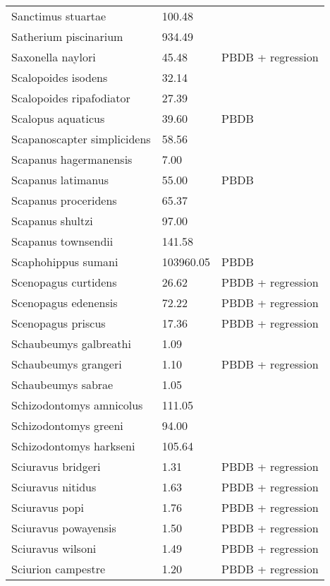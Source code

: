 \documentclass{article}
\begin{document}
\begin{center}
\begin{longtable}{p{} p{} p{}}
    Sanctimus stuartae & 100.48 & \cite{Tomiya2013} \\ 
    Satherium piscinarium & 934.49 & \cite{Tomiya2013} \\ 
    Saxonella naylori & 45.48 & PBDB + regression \\ 
    Scalopoides isodens & 32.14 & \cite{Tomiya2013} \\ 
    Scalopoides ripafodiator & 27.39 & \cite{Tomiya2013} \\ 
    Scalopus aquaticus & 39.60 & PBDB \\ 
    Scapanoscapter simplicidens & 58.56 & \cite{Tomiya2013} \\ 
    Scapanus hagermanensis & 7.00 & \cite{McKenna2011} \\ 
    Scapanus latimanus & 55.00 & PBDB \\ 
    Scapanus proceridens & 65.37 & \cite{Tomiya2013} \\ 
    Scapanus shultzi & 97.00 & \cite{McKenna2011} \\ 
    Scapanus townsendii & 141.58 & \cite{Smith2004} \\ 
    Scaphohippus sumani & 103960.05 & PBDB \\ 
    Scenopagus curtidens & 26.62 & PBDB + regression \\ 
    Scenopagus edenensis & 72.22 & PBDB + regression \\ 
    Scenopagus priscus & 17.36 & PBDB + regression \\ 
    Schaubeumys galbreathi & 1.09 & \cite{Loomis1911} \\ 
    Schaubeumys grangeri & 1.10 & PBDB + regression \\ 
    Schaubeumys sabrae & 1.05 & \cite{Matthew1901} \\ 
    Schizodontomys amnicolus & 111.05 & \cite{Tomiya2013} \\ 
    Schizodontomys greeni & 94.00 & \cite{McKenna2011} \\ 
    Schizodontomys harkseni & 105.64 & \cite{Tomiya2013} \\ 
    Sciuravus bridgeri & 1.31 & PBDB + regression \\ 
    Sciuravus nitidus & 1.63 & PBDB + regression \\ 
    Sciuravus popi & 1.76 & PBDB + regression \\ 
    Sciuravus powayensis & 1.50 & PBDB + regression \\ 
    Sciuravus wilsoni & 1.49 & PBDB + regression \\ 
    Sciurion campestre & 1.20 & PBDB + regression \\ 

\end{longtable}
\end{center}
\end{document}

